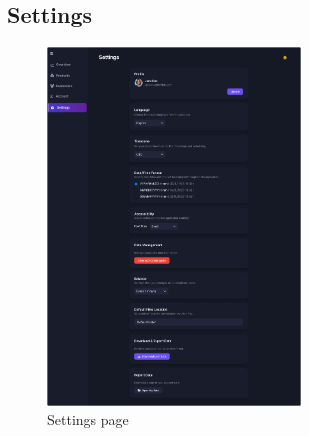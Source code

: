 \documentclass[12pt]{article}
\begin{document}
	
	\subsection{Settings}\label{subsec:settings}
	
	\vspace{0.4cm}
	\begin{figure}[h]
		\centering
		\includegraphics[width=0.6\textwidth]{pictures/admin/Settings_Admin}
		\caption{Settings page}\label{fig:figure10}
	\end{figure}
	
\end{document}
